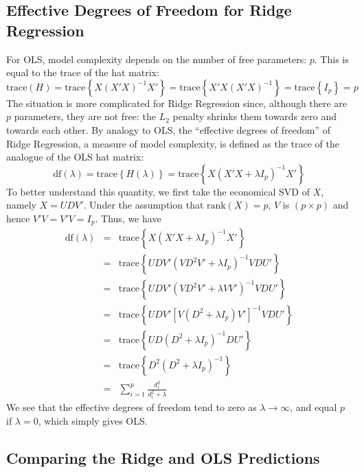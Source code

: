 \documentclass[12pt]{article}
\theoremstyle{definition}
\begin{document}
\subsection{Effective Degrees of Freedom for Ridge Regression}

For OLS, model complexity depends on the number of free parameters: $p$. This is equal to the trace of the hat matrix:
	$$\mbox{trace}(H) = \mbox{trace}\left\{ X(X'X)^{-1}X'\right\} = \mbox{trace}\left\{X'X(X'X)^{-1} \right\} = \mbox{trace}\left\{ I_p\right\}=p$$
The situation is more complicated for Ridge Regression since, although there are $p$ parameters, they are not free: the $L_2$ penalty shrinks them towards zero and towards each other. By analogy to OLS, the ``effective degrees of freedom'' of Ridge Regression, a measure of model complexity, is defined as the trace of the analogue of the OLS hat matrix:
	 $$\mbox{df}(\lambda) =\mbox{trace}\left\{ H(\lambda)\right\} =  \mbox{trace}\left\{ X(X'X + \lambda I_p)^{-1} X'\right\}$$
To better understand this quantity, we first take the economical SVD of $X$, namely $X = UDV'$. Under the assumption that $\mbox{rank}(X) = p$, $V$ is $(p\times p)$ and hence $V'V = V'V = I_p$. Thus, we have
	\begin{eqnarray*}
		\mbox{df}(\lambda) &=&  \mbox{trace}\left\{ X(X'X + \lambda I_p)^{-1} X'\right\}\\
		&=& \mbox{trace}\left\{UDV' (VD^2V' + \lambda I_p)^{-1}VDU' \right\}\\
		&=& \mbox{trace}\left\{UDV' (VD^2V' + \lambda VV')^{-1}VDU' \right\}\\
		&=& \mbox{trace}\left\{UDV' \left[V(D^2 + \lambda I_p)V' \right]^{-1}VDU' \right\}\\
		&=&\mbox{trace}\left\{UD(D^2 + \lambda I_p)^{-1}DU'\right\}\\
		&=& \mbox{trace}\left\{D^2(D^2 + \lambda I_p)^{-1}\right\}\\
		&=& \sum_{i=1}^p \frac{d_i^2}{d_i^2 + \lambda}
	\end{eqnarray*}
We see that the effective degrees of freedom tend to zero as $\lambda \rightarrow \infty$, and equal $p$ if $\lambda = 0$, which simply gives OLS. 

\subsection{Comparing the Ridge and OLS Predictions}
\end{document}
